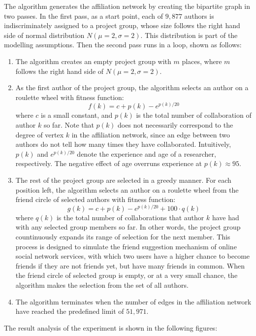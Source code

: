 \documentclass[11pt,a4paper]{article}
\begin{document}
The algorithm generates the affiliation network by creating the bipartite graph in two passes. In the first pass, as a start point, each of $9,877$ authors is indiscriminately assigned to a project group, whose size follows the right hand side of normal distribution $N(\mu=2, \sigma=2).$ This distribution is part of the modelling assumptions. Then the second pass runs in a loop, shown as follows:
\begin{enumerate}[topsep=0pt,itemsep=-1ex,partopsep=1ex,parsep=1ex]
\item The algorithm creates an empty project group with $m$ places, where $m$ follows the right hand side of $N(\mu=2, \sigma=2).$
\item As the first author of the project group, the algorithm selects an author on a roulette wheel with fitness function:
\[f(k)=c+p(k)-e^{p(k)/20}\]
where $c$ is a small constant, and $p(k)$ is the total number of collaboration of author $k$ so far. Note that $p(k)$ does not necessarily correspond to the degree of vertex $k$ in the affiliation network, since an edge between two authors do not tell how many times they have collaborated. Intuitively, $p(k)$ and $e^{p(k)/20}$ denote the experience and age of a researcher, respectively. The negative effect of age overruns experience at $p(k)\approx95.$
\item The rest of the project group are selected in a greedy manner. For each position left, the algorithm selects an author on a roulette wheel from the friend circle of selected authors with fitness function:
\[g(k)=c+p(k)-e^{p(k)/20}+100\cdot q(k)\]
where $q(k)$ is the total number of collaborations that author $k$ have had with any selected group members so far. In other words, the project group countinuously expands its range of selection for the next member. This process is designed to simulate the friend suggestion mechanism of online social network services, with which two users have a higher chance to become friends if they are not friends yet, but have many friends in common. When the friend circle of selected group is empty, or at a very small chance, the algorithm makes the selection from the set of all authors.
\item The algorithm terminates when the number of edges in the affiliation network have reached the predefined limit of $51,971.$
\end{enumerate}
The result analysis of the experiment is shown in the following figures:
\end{document}
